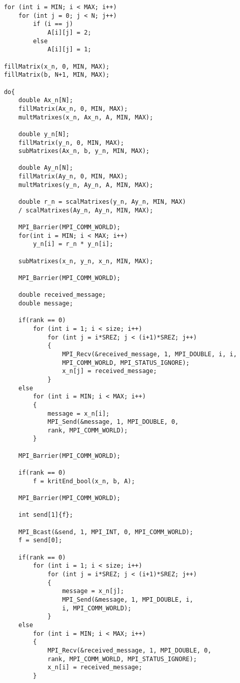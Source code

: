 \documentclass[a4paper, 14pt]{extarticle}
\begin{document}
\begin{verbatim}
    for (int i = MIN; i < MAX; i++)
        for (int j = 0; j < N; j++)
            if (i == j)
                A[i][j] = 2;
            else
                A[i][j] = 1;

    fillMatrix(x_n, 0, MIN, MAX);
    fillMatrix(b, N+1, MIN, MAX);

    do{
        double Ax_n[N];
        fillMatrix(Ax_n, 0, MIN, MAX);
        multMatrixes(x_n, Ax_n, A, MIN, MAX);

        double y_n[N];
        fillMatrix(y_n, 0, MIN, MAX);
        subMatrixes(Ax_n, b, y_n, MIN, MAX);

        double Ay_n[N];
        fillMatrix(Ay_n, 0, MIN, MAX);
        multMatrixes(y_n, Ay_n, A, MIN, MAX);

        double r_n = scalMatrixes(y_n, Ay_n, MIN, MAX) 
        / scalMatrixes(Ay_n, Ay_n, MIN, MAX);

        MPI_Barrier(MPI_COMM_WORLD);
        for(int i = MIN; i < MAX; i++)
            y_n[i] = r_n * y_n[i];

        subMatrixes(x_n, y_n, x_n, MIN, MAX);

        MPI_Barrier(MPI_COMM_WORLD);

        double received_message;
        double message;

        if(rank == 0)
            for (int i = 1; i < size; i++)
                for (int j = i*SREZ; j < (i+1)*SREZ; j++)
                {
                    MPI_Recv(&received_message, 1, MPI_DOUBLE, i, i, 
                    MPI_COMM_WORLD, MPI_STATUS_IGNORE);
                    x_n[j] = received_message;
                }
        else
            for (int i = MIN; i < MAX; i++)
            {
                message = x_n[i];
                MPI_Send(&message, 1, MPI_DOUBLE, 0,
                rank, MPI_COMM_WORLD);
            }

        MPI_Barrier(MPI_COMM_WORLD);

        if(rank == 0)
            f = kritEnd_bool(x_n, b, A);

        MPI_Barrier(MPI_COMM_WORLD);

        int send[1]{f};

        MPI_Bcast(&send, 1, MPI_INT, 0, MPI_COMM_WORLD);
        f = send[0];

        if(rank == 0)
            for (int i = 1; i < size; i++)
                for (int j = i*SREZ; j < (i+1)*SREZ; j++)
                {
                    message = x_n[j];
                    MPI_Send(&message, 1, MPI_DOUBLE, i,
                    i, MPI_COMM_WORLD);
                }
        else
            for (int i = MIN; i < MAX; i++)
            {
                MPI_Recv(&received_message, 1, MPI_DOUBLE, 0,
                rank, MPI_COMM_WORLD, MPI_STATUS_IGNORE);
                x_n[i] = received_message;
            }


\end{verbatim}
\end{document}

